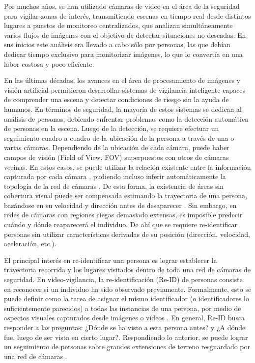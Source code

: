 \documentclass[../memoria.tex]{subfiles}
\begin{document}
\label{introduccion}

\indent Por muchos años, se han utilizado cámaras de video en el área de la seguridad para vigilar zonas de interés, transmitiendo escenas en tiempo real desde distintos lugares a puestos de monitoreo centralizados, que analizan simultáneamente varios flujos de imágenes con el objetivo de detectar situaciones no deseadas. En sus inicios este análisis era llevado a cabo sólo por personas, las que debían dedicar tiempo exclusivo para monitorizar imágenes, lo que lo convertía en una labor costosa y poco eficiente.

\indent En las últimas décadas, los avances en el área de procesamiento de imágenes y visión artificial permitieron desarrollar sistemas de vigilancia inteligente capaces de comprender una escena y detectar condiciones de riesgo sin la ayuda de humanos. En términos de seguridad, la mayoría de estos sistemas se dedican al análisis de personas, debiendo enfrentar problemas como la detección automática de personas en la escena. Luego de la detección, se requiere efectuar un seguimiento cuadro a cuadro de la ubicación de la persona a través de una o varias cámaras. Dependiendo de la ubicación de cada cámara, puede haber campos de visión (Field of View, FOV) superpuestos con otros de cámaras vecinas. En estos casos, se puede utilizar la relación existente entre la información capturada por cada cámara \cite{gilbert2006tracking, porikli2003multi}, pudiendo incluso inferir automáticamente la topología de la red de cámaras \cite{stein1999tracking, ellis2003learning}. De esta forma, la existencia de áreas sin cobertura visual puede ser compensada estimando la trayectoria de una persona, basándose en su velocidad y dirección antes de desaparecer \cite{bouma2013real}. Sin embargo, en redes de cámaras con regiones ciegas demasiado extensas, es imposible predecir cuándo y dónde reaparecerá el individuo. De ahí que se requiere re-identificar personas sin utilizar características derivadas de su posición (dirección, velocidad, aceleración, etc.). %

\indent El principal interés en re-identificar una persona es lograr establecer la trayectoria recorrida y los lugares visitados dentro de toda una red de cámaras de seguridad. En video-vigilancia, la re-identificación (Re-ID) de personas consiste en reconocer si un individuo ha sido observado previamente. Formalmente, esto se puede definir como la tarea de asignar el mismo identificador (o identificadores lo suficientemente parecidos) a todas las instancias de una persona, por medio de aspectos visuales capturados desde imágenes o vídeos \cite{vezzani2013people}. En general, Re-ID busca responder a las preguntas: ¿Dónde se ha visto a esta persona antes? y ¿A dónde fue, luego de ser vista en cierto lugar?. Respondiendo lo anterior, se puede lograr un seguimiento de personas sobre grandes extensiones de terreno resguardado por una red de cámaras \cite{bouma2013real}. 
\end{document}
